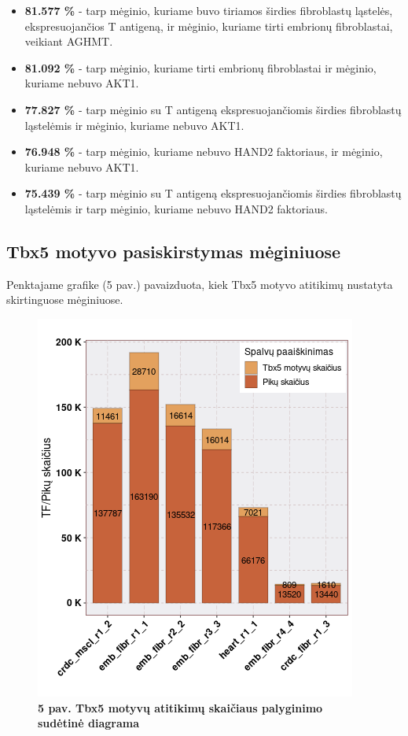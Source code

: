 \documentclass[12pt]{article}
\begin{document}
\begin{itemize}
    \item \textbf{81.577 \%} - tarp mėginio, kuriame buvo tiriamos širdies
        fibroblastų ląstelės, ekspresuojančios T antigeną, ir mėginio, kuriame
        tirti embrionų fibroblastai, veikiant AGHMT.
    \item \textbf{81.092 \%} - tarp mėginio, kuriame tirti embrionų
        fibroblastai ir mėginio, kuriame nebuvo AKT1.
    \item \textbf{77.827 \%} - tarp mėginio su T antigeną ekspresuojančiomis
        širdies fibroblastų ląstelėmis ir mėginio, kuriame nebuvo AKT1.
    \item \textbf{76.948 \%} - tarp mėginio, kuriame nebuvo HAND2 faktoriaus,
        ir mėginio, kuriame nebuvo AKT1.
    \item \textbf{75.439 \%} - tarp mėginio su T antigeną ekspresuojančiomis
        širdies fibroblastų ląstelėmis ir tarp mėginio, kuriame nebuvo HAND2
        faktoriaus.
  \end{itemize}

\newpage


\subsection{Tbx5 motyvo pasiskirstymas mėginiuose}
Penktajame grafike (5 pav.) pavaizduota, kiek Tbx5 motyvo atitikimų nustatyta
skirtinguose mėginiuose.

\begin{figure}[htb]
    \begin{center}
        \includegraphics[width=0.6\linewidth]{../Figures/tf_hit_percentage.png}
        \caption*{\small\textbf{5 pav. Tbx5 motyvų atitikimų skaičiaus palyginimo
                                sudėtinė diagrama}}
    \end{center}
\end{figure}
\end{document}
